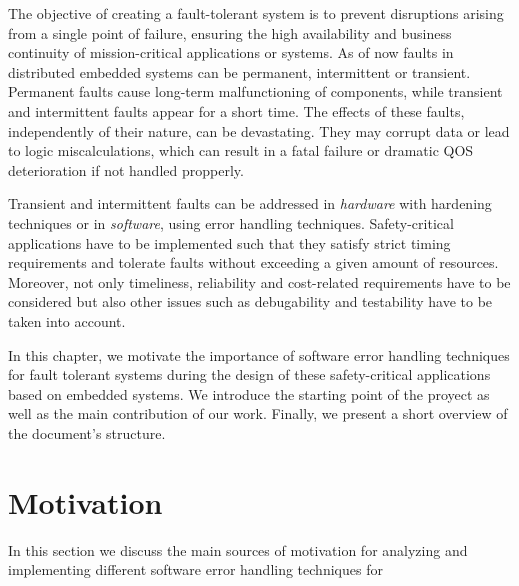 \documentclass[10pt, a4paper]{report}
\begin{document}
The objective of creating a fault-tolerant system is to prevent disruptions
arising from a single point of failure, ensuring the high availability and
business continuity of mission-critical applications or systems. As of now 
faults in distributed embedded systems can be permanent, intermittent or 
transient. Permanent faults cause long-term malfunctioning of components, while 
transient and intermittent faults appear for a short time. The effects of these 
faults, independently of their nature, can be devastating. They may corrupt data
or lead to logic miscalculations, which can result in a fatal failure or 
dramatic \acrshort{QOS} deterioration if not handled propperly. 

Transient and intermittent faults can be addressed in \emph{hardware} with
hardening techniques or in \emph{software}, using error handling techniques. 
Safety-critical applications have to be implemented such that they satisfy 
strict timing requirements and tolerate faults without exceeding a given amount 
of resources. Moreover, not only timeliness, reliability and cost-related 
requirements have to be considered but also other issues such as debugability 
and testability have to be taken into account. 



In this chapter, we motivate the importance of software error handling
techniques for fault tolerant systems during the design of these safety-critical
applications based on embedded systems. We introduce the starting point of the
proyect as well as the main contribution of our work. Finally, we present a
short overview of the document's structure.

\section{Motivation}

In this section we discuss the main sources of motivation for analyzing and
implementing different software error handling techniques for 

\newpage

\glsaddall
\printnoidxglossary[type=\acronymtype,title={Abreviaturas}]
\end{document}
